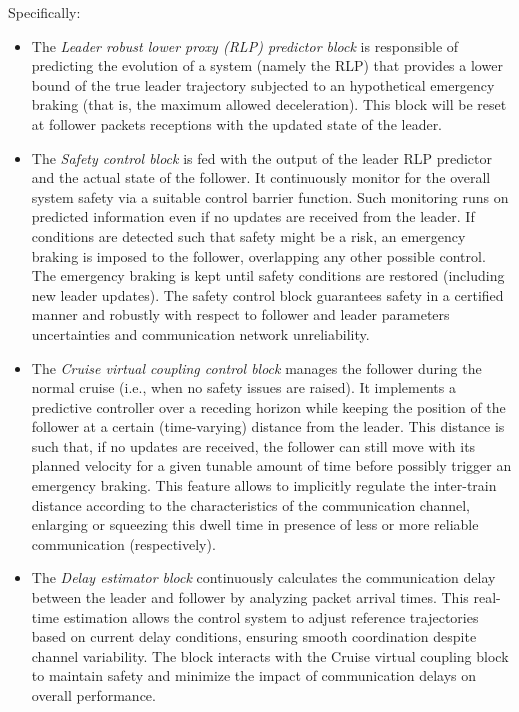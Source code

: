 Specifically:
\begin{itemize}
	\item The {\em Leader robust lower proxy (RLP) predictor block} is responsible of predicting the evolution of a system (namely the RLP) that provides a lower bound of the true leader trajectory subjected to an hypothetical emergency braking (that is, the maximum allowed deceleration). 
	This block will be reset at follower packets receptions with the updated state of the leader. 
	\item The {\em Safety control block} is fed with the output of the leader RLP predictor and the actual state of the follower. It continuously monitor for the overall system safety via a suitable control barrier function. Such monitoring runs on predicted information even if no updates are received from the leader. If conditions are detected such that safety might be a risk, an emergency braking is imposed to the follower, overlapping any other possible control. The emergency braking is kept until safety conditions are restored (including new leader updates). The safety control block guarantees safety in a certified manner and robustly with respect to follower and leader parameters uncertainties and communication network unreliability. 
	\item The {\em Cruise virtual coupling control block} manages the follower during the normal cruise (i.e., when no safety issues are raised). It implements a predictive controller over a receding horizon while keeping the position of the follower at a certain (time-varying) distance from the leader. This distance is such that, if no updates are received, the follower can still move with its planned velocity for a given tunable amount of time before possibly trigger an emergency braking. 
	This feature allows to implicitly regulate the inter-train distance according to the characteristics of the communication channel, enlarging or squeezing this dwell time in presence of less or more reliable communication (respectively). 
	\item The {\em  Delay estimator block} continuously calculates the communication delay between the leader and follower by analyzing packet arrival times. This real-time estimation allows the control system to adjust reference trajectories based on current delay conditions, ensuring smooth coordination despite channel variability. The block interacts with the Cruise virtual coupling block to maintain safety and minimize the impact of communication delays on overall performance.
\end{itemize} 
